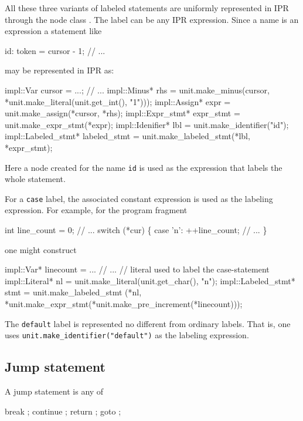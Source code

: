 \documentclass[11pt]{article}
\begin{document}
All these three variants of labeled statements are uniformly represented in
IPR through the node class .  The label can be any
IPR expression.  Since a name is an expression a statement like 
\begin{Program}
  id:
     token = cursor - 1;
     // ...
\end{Program}
may be represented in IPR as:
\begin{Program}
  impl::Var cursor = ...;
  // ...
  impl::Minus* rhs = unit.make_minus(cursor, 
                                     *unit.make_literal(unit.get_int(), "1")));
  impl::Assign* expr = unit.make_assign(*cursor, *rhs);
  impl::Expr_stmt* expr_stmt = unit.make_expr_stmt(*expr);
  impl::Idenifier* lbl = unit.make_identifier("id");
  impl::Labeled_stmt* labeled_stmt = unit.make_labeled_stmt(*lbl, *expr_stmt);
\end{Program}
Here a node created for the name \texttt{id} is used as the expression
that labels the whole statement.

For a \texttt{case} label, the associated constant expression is used as the
labeling expression.  For example, for the program fragment
\begin{Program}
  int line_count = 0;
  // ...
  switch (*cur) \{
    case '{\bslash}n':
       ++line_count;
       // ...
  \}
\end{Program}
one might construct
\begin{Program}
  impl::Var* linecount = ...
  // ...
  // literal used to label the case-statement
  impl::Literal* nl = unit.make_literal(unit.get_char(), "{\bslash\bslash}n");
  impl::Labeled_stmt* stmt = unit.make_labeled_stmt
     (*nl, *unit.make_expr_stmt(*unit.make_pre_increment(*linecount)));
\end{Program}

The \texttt{default} label is represented no different from ordinary labels.
That is, one uses \verb=unit.make_identifier("default")= as the labeling
expression. 


\subsection{Jump statement}
\label{sec:stmt.jump}

A jump statement is any of
\begin{Grammar}
      break ;
      continue ;
      return  ;
      goto  ;
\end{Grammar}
\end{document}
